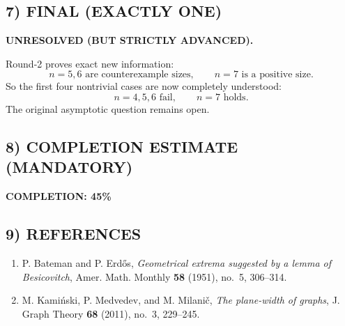\subsection*{7) FINAL (EXACTLY ONE)}

\textbf{UNRESOLVED (BUT STRICTLY ADVANCED).}

Round-2 proves exact new information:
\[
n=5,6 \text{ are counterexample sizes},\qquad n=7 \text{ is a positive size}.
\]
So the first four nontrivial cases are now completely understood:
\[
n=4,5,6 \text{ fail},\qquad n=7 \text{ holds}.
\]
The original asymptotic question remains open.

\subsection*{8) COMPLETION ESTIMATE (MANDATORY)}

\textbf{COMPLETION: 45\%}

\subsection*{9) REFERENCES}

\begin{enumerate}
\item P. Bateman and P. Erd\H{o}s, \emph{Geometrical extrema suggested by a lemma of Besicovitch}, Amer. Math. Monthly \textbf{58} (1951), no.~5, 306--314.
\item M. Kami\'nski, P. Medvedev, and M. Milani\v{c}, \emph{The plane-width of graphs}, J. Graph Theory \textbf{68} (2011), no.~3, 229--245.
\end{enumerate}
